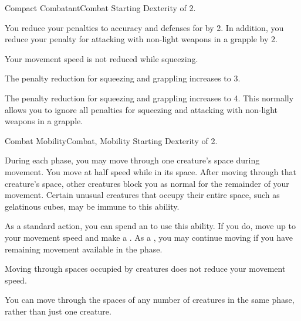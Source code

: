     \begin{feat}{Compact Combatant}{Combat}
        \featpre Starting Dexterity of 2.
        \featben

         You reduce your penalties to accuracy and defenses for  by 2.
        In addition, you reduce your penalty for attacking with non-light weapons in a grapple by 2.

         Your movement speed is not reduced while squeezing.

         The penalty reduction for squeezing and grappling increases to 3.

         The penalty reduction for squeezing and grappling increases to 4.
        This normally allows you to ignore all penalties for squeezing and attacking with non-light weapons in a grapple.
    \end{feat}

    \begin{feat}{Combat Mobility}{Combat, Mobility}
        \featpre Starting Dexterity of 2.
        \featben

         During each phase, you may move through one creature's space during movement.
        You move at half speed while in its space.
        After moving through that creature's space, other creatures block you as normal for the remainder of your movement.
        Certain unusual creatures that occupy their entire space, such as gelatinous cubes, may be immune to this ability.

         As a standard action, you can spend an  to use this ability.
        If you do, move up to your movement speed and make a .
        As a , you may continue moving if you have remaining movement available in the phase.

         Moving through spaces occupied by creatures does not reduce your movement speed.

         You can move through the spaces of any number of creatures in the same phase, rather than just one creature.
    \end{feat}

